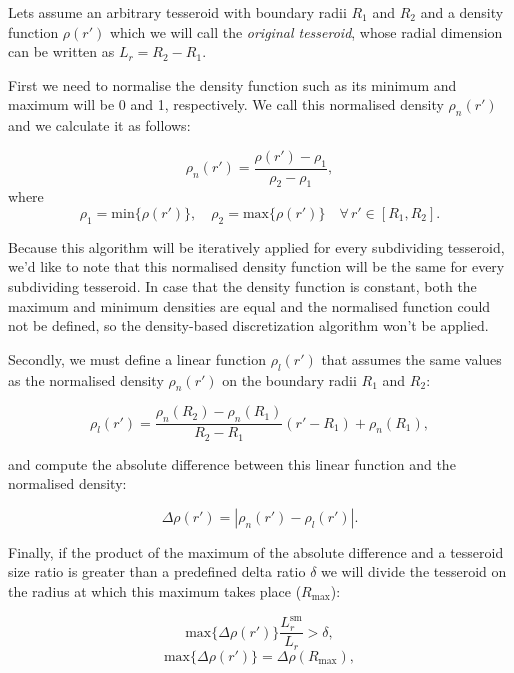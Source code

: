 \documentclass[extra]{gji}
\begin{document}
Lets assume an arbitrary tesseroid with boundary radii $R_1$ and $R_2$ 
and a density function $\rho(r')$ which we will call the 
\emph{original tesseroid}, whose radial dimension can be written as
$L_r = R_2 - R_1$.

First we need to normalise the density function such as its minimum and 
maximum will be 0 and 1, respectively.
We call this normalised density $\rho_n(r')$ and we calculate it as 
follows:

\begin{equation}
    \rho_n(r') = \frac{\rho(r') - \rho_1}{\rho_2 - \rho_1},
\end{equation}
\noindent where
\begin{equation}
    \rho_1 = \text{min}\{ \rho(r') \}, \quad
    \rho_2 = \text{max}\{ \rho(r') \} \quad
    \forall \, r' \in [R_1, R_2].
\end{equation}

\noindent Because this algorithm will be iteratively applied for every 
subdividing tesseroid, we'd like to note that this normalised density 
function will be the same for every subdividing tesseroid.
In case that the density function is constant, both the maximum and 
minimum densities are equal and the normalised function could not 
be defined, so the density-based discretization algorithm won't be 
applied.

Secondly, we must define a linear function $\rho_l(r')$ that assumes 
the same values as the normalised density $\rho_n(r')$ on the boundary 
radii $R_1$ and $R_2$:

\begin{equation}
    \rho_l(r') =
    \frac{ \rho_n(R_2) - \rho_n(R_1) }{ R_2 - R_1 } (r' - R_1) + \rho_n(R_1),
    \label{eq:density-reference-line}
\end{equation}

\noindent and compute the absolute difference between this linear 
function and the normalised density:

\begin{equation}
    \Delta \rho (r') = | \rho_n(r') - \rho_l(r') |.
    \label{eq:density-abs-diff}
\end{equation}

Finally, if the product of the maximum of the absolute difference and a 
tesseroid size ratio is greater than a predefined delta ratio $\delta$ 
we will divide the tesseroid on the radius at which this maximum takes 
place ($R_\text{max}$):

\begin{equation}
    \text{max}\{ \Delta \rho(r') \} \frac{L_r^\text{sm}}{L_r} > \delta,
    \label{eq:delta-density}
\end{equation}
\begin{equation}
    \text{max}\{ \Delta \rho(r') \} = \Delta \rho(R_\text{max}),
\end{equation}
\end{document}
